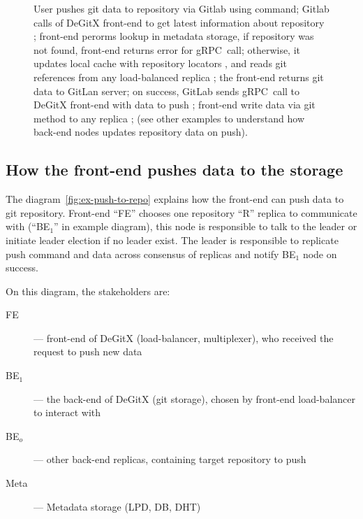 \begin{figure}
\caption{%
  User pushes git data to repository  via Gitlab using  command;%
  Gitlab calls  of DeGitX front-end to get latest information%
  about repository ; front-end perorms lookup in metadata storage,%
  if repository was not found, front-end returns error for gRPC~call;%
  otherwise, it updates local cache with repository locators , and reads git references from%
  any load-balanced replica ; the front-end returns git data to GitLan server;%
  on success, GitLab sends  gRPC~call to DeGitX front-end with data to push ;%
  front-end write data via  git method to any replica ;%
  (see other examples to understand how back-end nodes updates repository data on push).%
}\label{fig:gitlab-push-gitaly}
\end{figure}

\subsection{How the front-end pushes data to the storage}

The diagram~\ref{fig:ex-push-to-repo} explains how the front-end can push data to git repository.
Front-end ``FE'' chooses one repository ``R'' replica to communicate with (``BE$_{1}$'' in example diagram),
this node is responsible to talk to the leader or initiate leader election if no leader exist.
The leader is responsible to replicate push command and data across consensus of replicas
and notify BE$_{1}$ node on success.

On this diagram, the stakeholders are:
\begin{description}
  \item[FE] --- front-end of DeGitX (load-balancer, multiplexer), who received the request to push new data
  \item[BE$_{1}$] --- the back-end of DeGitX (git storage), chosen by front-end load-balancer to interact with
  \item[BE$_{o}$] --- other back-end replicas, containing target repository to push
  \item[Meta] --- Metadata storage (LPD, DB, DHT)
\end{description}

